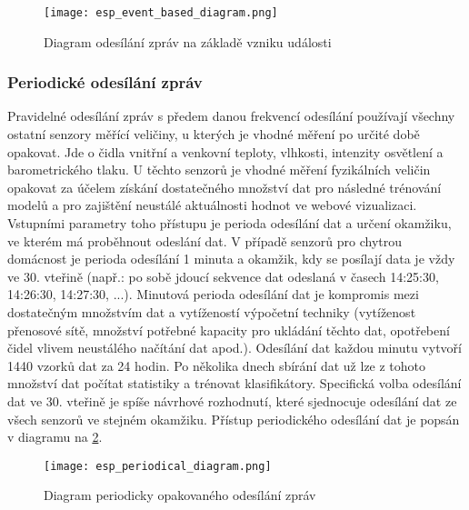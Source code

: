 \begin{figure}[H]
  \centering
  \texttt{[image: esp\_event\_based\_diagram.png]}
  \caption{Diagram odesílání zpráv na základě vzniku události}
  \label{fig:esp_event_based_diagram}
\end{figure} 
 
 \subsubsection*{Periodické odesílání zpráv}
Pravidelné odesílání zpráv s předem danou frekvencí odesílání používají všechny ostatní senzory měřící veličiny, u kterých je vhodné měření po určité době opakovat. Jde o čidla vnitřní a venkovní teploty, vlhkosti, intenzity osvětlení a barometrického tlaku. U těchto senzorů je vhodné měření fyzikálních veličin opakovat za účelem získání dostatečného množství dat pro následné trénování modelů a pro zajištění neustálé aktuálnosti hodnot ve webové vizualizaci. Vstupními parametry toho přístupu je perioda odesílání dat a určení okamžiku, ve kterém má proběhnout odeslání dat. V případě senzorů pro chytrou domácnost je perioda odesílání 1 minuta a okamžik, kdy se posílají data je vždy ve 30. vteřině (např.: po sobě jdoucí sekvence dat odeslaná v časech 14:25:30, 14:26:30, 14:27:30, ...). Minutová perioda odesílání dat je kompromis mezi dostatečným množstvím dat a vytížeností výpočetní techniky (vytíženost přenosové sítě, množství potřebné kapacity pro ukládání těchto dat, opotřebení čidel vlivem neustálého načítání dat apod.). Odesílání dat každou minutu vytvoří 1440 vzorků dat za 24 hodin. Po několika dnech sbírání dat už lze z tohoto množství dat počítat statistiky a trénovat klasifikátory. Specifická volba odesílání dat ve 30. vteřině je spíše návrhové rozhodnutí, které sjednocuje odesílání dat ze všech senzorů ve stejném okamžiku. Přístup periodického odesílání dat je popsán v diagramu na \cref{fig:esp_periodical_diagram}.

\begin{figure}[H]
  \centering
  \texttt{[image: esp\_periodical\_diagram.png]}
  \caption{Diagram periodicky opakovaného odesílání zpráv}
  \label{fig:esp_periodical_diagram}
\end{figure}

